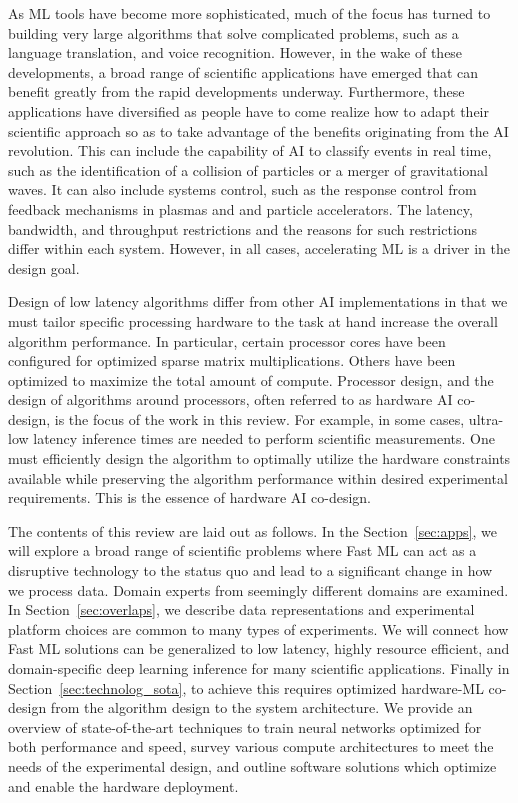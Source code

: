 As ML tools have become more sophisticated, much of the focus has turned to building very large  algorithms that solve complicated problems, such as a language translation, and voice recognition. 
However, in the wake of these developments, a broad range of scientific applications have emerged that can benefit  greatly from the rapid developments underway. 
Furthermore, these applications have diversified as people have to come realize how to adapt their scientific approach so as to take advantage of the benefits originating from the AI revolution. 
This can include the capability of AI to classify events in real time, such as the identification of a collision of particles or a merger of gravitational waves. 
It can also include systems control, such as the response control from feedback mechanisms in plasmas and and particle accelerators. 
The latency, bandwidth, and throughput restrictions and the reasons for such restrictions differ within each system. However, in all cases, accelerating ML is a driver in the design goal. 

Design of low latency algorithms differ from other AI implementations in that we must tailor specific processing hardware to the task at hand increase the overall algorithm performance. 
In particular, certain processor cores have been configured for optimized sparse matrix multiplications. 
Others have been optimized to maximize the total amount of compute. 
Processor design, and the design of algorithms around processors,  often referred to as hardware AI co-design, is the focus of the work in this review. 
For example, in some cases, ultra-low latency inference times are needed to perform scientific measurements. 
One must efficiently design the algorithm to optimally utilize the hardware constraints available while preserving the algorithm performance within desired experimental requirements. This is the essence of hardware AI co-design.

The contents of this review are laid out as follows.  In the Section~\ref{sec:apps}, we will explore a broad range of scientific problems where Fast ML can act as a disruptive technology to the status quo and lead to a significant change in how we process data.  
Domain experts from seemingly different domains are examined.  In Section~\ref{sec:overlaps}, we describe  data representations and experimental platform choices are common to many types of experiments.  
We will connect how Fast ML solutions can be generalized to low latency, highly resource efficient, and domain-specific deep learning inference for many scientific applications. Finally in Section~\ref{sec:technolog_sota}, to achieve this requires optimized hardware-ML co-design from the algorithm design to the system architecture.  
We provide an overview of state-of-the-art techniques to train neural networks optimized for both performance and speed, survey various compute architectures to meet the needs of the experimental design, and outline software solutions which optimize and enable the hardware deployment.    

